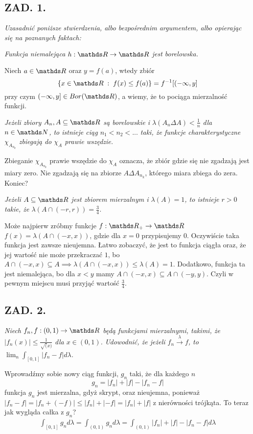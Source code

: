 \documentclass{article}
\begin{document}
\subsection*{ZAD. 1.}
\emph{Uzasadnić poniższe stwierdzenia, albo bezpośrednim argumentem, albo opierając się na poznanych faktach:}
\medskip

\emph{\color{def}Funkcja niemalejąca $h:\R\to\R$ jest borelowska.}
\smallskip

Niech $a\in \R$ oraz $y=f(a)$, wtedy zbiór
$$\{x\in\R\;:\;f(x)\leq f(a)\}=f^{-1}[(-\infty,y]$$
przy czym $(-\infty,y]\in Bor(\R)$, a wiemy, że to pociąga mierzalność funkcji.
\medskip

\emph{\color{def}Jeżeli zbiory $A_n,A\subseteq \R$ są borelowskie i $\lambda(A_n\Delta A)<\frac1n$ dla $n\in\N$, to istnieje ciąg $n_1<n_2<...$ taki, że funkcje charakterystyczne $\chi_{A_{n_k}}$ zbiegają do $\chi_A$ prawie wszędzie.}
\medskip

Zbieganie $\chi_{A_{n_k}}$ prawie wszędzie do $\chi_A$ oznacza, że zbiór gdzie się nie zgadzają jest miary zero. Nie zgadzają się na zbiorze $A\Delta A_{n_k}$, którego miara zbiega do zera. Koniec?
\medskip

\emph{\color{def}Jeżeli $A\subseteq\R$ jest zbiorem mierzalnym i $\lambda(A)=1$, to istnieje $r>0$ takie, że $\lambda(A\cap(-r,r))=\frac34$.}
\medskip

Może najpierw zróbmy funkcje $f:\R_+\to\R$ $f(x)=\lambda(A\cap(-x,x))$, gdzie dla $x=0$ przypisujemy $0$. Oczywiście taka funkcja jest zawsze nieujemna. Łatwo zobaczyć, że jest to funkcja ciągła oraz, że jej wartość nie może przekraczać $1$, bo $A\cap(-x,x)\subseteq A\implies \lambda(A\cap(-x,x))\leq\lambda(A)=1$. Dodatkowo, funkcja ta jest niemalejąca, bo dla $x<y$ mamy $A\cap(-x,x)\subseteq A\cap(-y,y)$. Czyli w pewnym miejscu musi przyjąć wartość $\frac34$.

\subsection*{ZAD. 2.}
\emph{Niech $f_n,f:(0,1)\to\R$ będą funkcjami mierzalnymi, takimi, że $|f_n(x)|\leq\frac1{\sqrt(x)}$ dla $x\in(0,1)$. Udowodnić, że jeżeli $f_n\xrightarrow[]{\lambda}f$, to $\lim_n\int_{[0,1]}|f_n-f|d\lambda$.}
\medskip

Wprowadźmy sobie nowy ciąg funkcji, $g_n$ taki, że dla każdego $n$
$$g_n=|f_n|+|f|-|f_n-f|$$
funkcja $g_n$ jest mierzalna, gdyż skrypt, oraz nieujemna, ponieważ $|f_n-f|=|f_n+(-f)|\leq|f_n|+|-f|=|f_n|+|f|$ z nierówności trójkąta. To teraz jak wygląda całka z $g_n$?
\begin{align*}
    \int_{[0,1]} g_nd\lambda=\int_{(0,1)}g_nd\lambda=\int_{(0,1)}|f_n|+|f|-|f_n-f|d\lambda
\end{align*}
\end{document}
